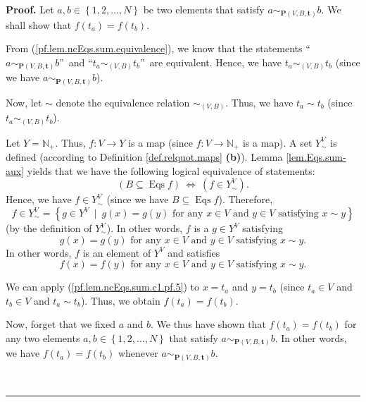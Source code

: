 \documentclass[numbers=enddot,12pt,final,onecolumn,notitlepage]{scrartcl}%
\theoremstyle{definition}
\newenvironment{proof}[1][Proof]{\noindent\textbf{#1.} }{\ \rule{0.5em}{0.5em}}
\newenvironment{verlong}{}{}
\begin{document}
\begin{proof}
\begin{verlong}
Let $a,b\in\left\{  1,2,\ldots,N\right\}  $ be two elements that satisfy
$a\sim_{\mathbf{P}\left(  V,B,\mathbf{t}\right)  }b$. We shall show that
$f\left(  t_{a}\right)  =f\left(  t_{b}\right)  $.

From (\ref{pf.lem.ncEqs.sum.equivalence}), we know that the statements
\textquotedblleft$a\sim_{\mathbf{P}\left(  V,B,\mathbf{t}\right)  }%
b$\textquotedblright\ and \textquotedblleft$t_{a}\sim_{\left(  V,B\right)
}t_{b}$\textquotedblright\ are equivalent. Hence, we have $t_{a}\sim_{\left(
V,B\right)  }t_{b}$ (since we have $a\sim_{\mathbf{P}\left(  V,B,\mathbf{t}%
\right)  }b$).

Now, let $\sim$ denote the equivalence relation $\sim_{\left(  V,B\right)  }$.
Thus, we have $t_{a}\sim t_{b}$ (since $t_{a}\sim_{\left(  V,B\right)  }t_{b}$).

Let $Y=\mathbb{N}_{+}$. Thus, $f:V\rightarrow Y$ is a map (since
$f:V\rightarrow\mathbb{N}_{+}$ is a map). A set $Y_{\sim}^{V}$ is defined
(according to Definition \ref{def.relquot.maps} \textbf{(b)}). Lemma
\ref{lem.Eqs.sum-aux} yields that we have the following logical equivalence of
statements:%
\[
\left(  B\subseteq\operatorname*{Eqs}f\right)  \ \Longleftrightarrow\ \left(
f\in Y_{\sim}^{V}\right)  .
\]
Hence, we have $f\in Y_{\sim}^{V}$ (since we have $B\subseteq
\operatorname*{Eqs}f$). Therefore,%
\[
f\in Y_{\sim}^{V}=\left\{  g\in Y^{V}\ \mid\ g\left(  x\right)  =g\left(
y\right)  \text{ for any }x\in V\text{ and }y\in V\text{ satisfying }x\sim
y\right\}
\]
(by the definition of $Y_{\sim}^{V}$). In other words, $f$ is a $g\in Y^{V}$
satisfying
\[
g\left(  x\right)  =g\left(  y\right)  \text{ for any }x\in V\text{ and }y\in
V\text{ satisfying }x\sim y.
\]
In other words, $f$ is an element of $Y^{V}$ and satisfies%
\begin{equation}
f\left(  x\right)  =f\left(  y\right)  \text{ for any }x\in V\text{ and }y\in
V\text{ satisfying }x\sim y. \label{pf.lem.ncEqs.sum.c1.pf.5}%
\end{equation}


We can apply (\ref{pf.lem.ncEqs.sum.c1.pf.5}) to $x=t_{a}$ and $y=t_{b}$
(since $t_{a}\in V$ and $t_{b}\in V$ and $t_{a}\sim t_{b}$). Thus, we obtain
$f\left(  t_{a}\right)  =f\left(  t_{b}\right)  $.

Now, forget that we fixed $a$ and $b$. We thus have shown that $f\left(
t_{a}\right)  =f\left(  t_{b}\right)  $ for any two elements $a,b\in\left\{
1,2,\ldots,N\right\}  $ that satisfy $a\sim_{\mathbf{P}\left(  V,B,\mathbf{t}%
\right)  }b$. In other words, we have $f\left(  t_{a}\right)  =f\left(
t_{b}\right)  $ whenever $a\sim_{\mathbf{P}\left(  V,B,\mathbf{t}\right)  }b$.


\end{verlong}
\end{proof}
\end{document}
